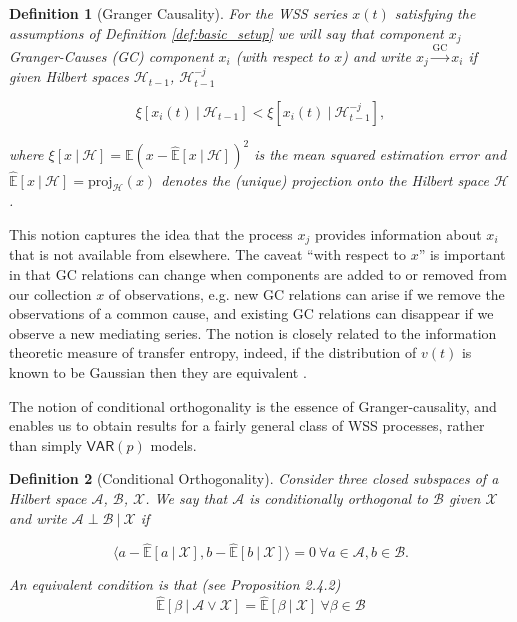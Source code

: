 \documentclass{statsoc}
\def\gc{\overset{\text{GC}}{\rightarrow}}  %
\def\VAR{\mathsf{VAR}}  %
\def\H{\mathcal{H}}  %
\newcommand{\linE}[2]{\hat{\E}[#1\ |\ #2]}  %
\newcommand{\linEerr}[2]{\xi[#1\ |\ #2]}  %
\newtheorem{definition}{Definition}
\def\H{\mathcal{H}}  %
\def\E{\mathbb{E}}  %
\newcommand{\inner}[2]{\langle #1, #2 \rangle}  %
\begin{document}
\begin{definition}[Granger Causality]
  \label{def:granger_causality}
  For the WSS series $x(t)$ satisfying the assumptions of Definition
  \ref{def:basic_setup} we will say that component $x_j$
  \textit{Granger-Causes} (GC) component $x_i$ (with respect to $x$)
  and write $x_j \gc x_i$ if given Hilbert spaces $\H_{t - 1}$,
  $\H^{-j}_{t - 1}$

\begin{equation}
  \linEerr{x_i(t)}{\H_{t - 1}} < \linEerr{x_i(t)}{\H^{-j}_{t - 1}},
\end{equation}

where $\xi[x \ |\ \H] = \E (x - \linE{x}{\H})^2$ is the mean squared
estimation error and $\linE{x}{\H} = \text{proj}_{\H}(x)$ denotes the
(unique) projection onto the Hilbert space $\H$.
\end{definition}

This notion captures the idea that the process $x_j$ provides
information about $x_i$ that is not available from elsewhere.  The
caveat ``with respect to $x$'' is important in that GC relations can
change when components are added to or removed from our collection $x$
of observations, e.g. new GC relations can arise if we remove the
observations of a common cause, and existing GC relations can
disappear if we observe a new mediating series. The notion is closely
related to the information theoretic measure of transfer entropy,
indeed, if the distribution of $v(t)$ is known to be Gaussian then
they are equivalent \cite{barnett2009granger}.

The notion of conditional orthogonality is the essence of
Granger-causality, and enables us to obtain results for a fairly
general class of WSS processes, rather than simply $\VAR(p)$ models.

\begin{definition}[Conditional Orthogonality]
  \label{lem:conditional_orthogonality_equivalence}
  Consider three closed subspaces of a Hilbert space $\mathcal{A}$,
  $\mathcal{B}$, $\mathcal{X}$.  We say that $\mathcal{A}$ is
  conditionally orthogonal to $\mathcal{B}$ given $\mathcal{X}$
  and write $\mathcal{A} \perp \mathcal{B}\ |\ \mathcal{X}$ if

    \begin{equation*}
      \inner{a - \linE{a}{\mathcal{X}}}{b - \linE{b}{\mathcal{X}}} = 0\ \forall a \in \mathcal{A}, b \in \mathcal{B}.
    \end{equation*}

  An equivalent condition is that (see \cite{lindquist} Proposition 2.4.2)
  \begin{equation*}
    \linE{\beta}{\mathcal{A} \vee \mathcal{X}} = \linE{\beta}{\mathcal{X}}\ \forall \beta \in \mathcal{B}
  \end{equation*}
\end{definition}
\end{document}
